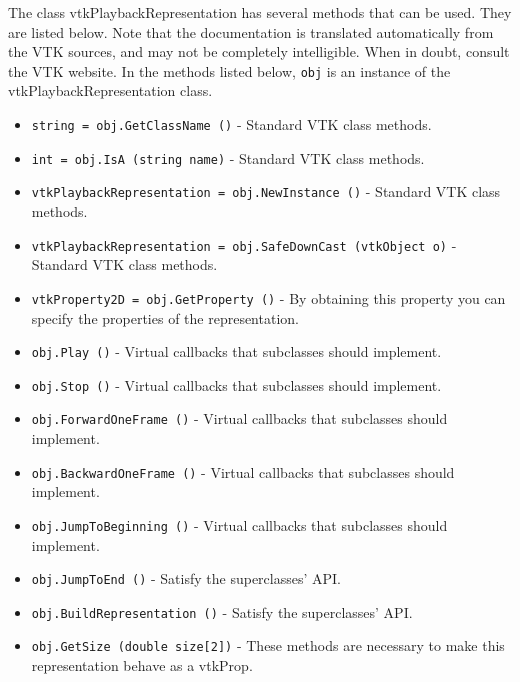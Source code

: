 The class vtkPlaybackRepresentation has several methods that can be used.
  They are listed below.
Note that the documentation is translated automatically from the VTK sources,
and may not be completely intelligible.  When in doubt, consult the VTK website.
In the methods listed below, \verb|obj| is an instance of the vtkPlaybackRepresentation class.
\begin{itemize}
\item  \verb|string = obj.GetClassName ()| -  Standard VTK class methods.

\item  \verb|int = obj.IsA (string name)| -  Standard VTK class methods.

\item  \verb|vtkPlaybackRepresentation = obj.NewInstance ()| -  Standard VTK class methods.

\item  \verb|vtkPlaybackRepresentation = obj.SafeDownCast (vtkObject o)| -  Standard VTK class methods.

\item  \verb|vtkProperty2D = obj.GetProperty ()| -  By obtaining this property you can specify the properties of the 
 representation.

\item  \verb|obj.Play ()| -  Virtual callbacks that subclasses should implement.

\item  \verb|obj.Stop ()| -  Virtual callbacks that subclasses should implement.

\item  \verb|obj.ForwardOneFrame ()| -  Virtual callbacks that subclasses should implement.

\item  \verb|obj.BackwardOneFrame ()| -  Virtual callbacks that subclasses should implement.

\item  \verb|obj.JumpToBeginning ()| -  Virtual callbacks that subclasses should implement.

\item  \verb|obj.JumpToEnd ()| -  Satisfy the superclasses' API.

\item  \verb|obj.BuildRepresentation ()| -  Satisfy the superclasses' API.

\item  \verb|obj.GetSize (double size[2])| -  These methods are necessary to make this representation behave as
 a vtkProp.


\end{itemize}
